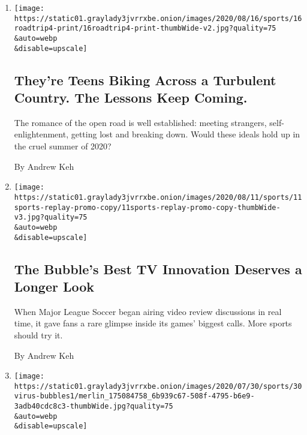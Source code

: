 \begin{enumerate}
\def\labelenumi{\arabic{enumi}.}
\item
  \href{/2020/08/16/sports/cycling/coronavirus-protests-masks-biking.html}{}

  \texttt{[image: https://static01.graylady3jvrrxbe.onion/images/2020/08/16/sports/16roadtrip4-print/16roadtrip4-print-thumbWide-v2.jpg?quality=75\\\&auto=webp\\\&disable=upscale]}

  \hypertarget{theyre-teens-biking-across-a-turbulent-country-the-lessons-keep-coming}{%
  \subsection{They're Teens Biking Across a Turbulent Country. The
  Lessons Keep
  Coming.}\label{theyre-teens-biking-across-a-turbulent-country-the-lessons-keep-coming}}

  The romance of the open road is well established: meeting strangers,
  self-enlightenment, getting lost and breaking down. Would these ideals
  hold up in the cruel summer of 2020?

  By Andrew Keh
\item
  \href{/2020/08/11/sports/soccer/MLS-VAR-portland-orlando.html}{}

  \texttt{[image: https://static01.graylady3jvrrxbe.onion/images/2020/08/11/sports/11sports-replay-promo-copy/11sports-replay-promo-copy-thumbWide-v3.jpg?quality=75\\\&auto=webp\\\&disable=upscale]}

  \hypertarget{the-bubbles-best-tv-innovation-deserves-a-longer-look}{%
  \subsection{The Bubble's Best TV Innovation Deserves a Longer
  Look}\label{the-bubbles-best-tv-innovation-deserves-a-longer-look}}

  When Major League Soccer began airing video review discussions in real
  time, it gave fans a rare glimpse inside its games' biggest calls.
  More sports should try it.

  By Andrew Keh
\item
  \href{/2020/07/30/sports/basketball/sports-bubble-nba-mlb.html}{}

  \texttt{[image: https://static01.graylady3jvrrxbe.onion/images/2020/07/30/sports/30virus-bubbles1/merlin\_175084758\_6b939c67-508f-4795-b6e9-3adb40cdc8c3-thumbWide.jpg?quality=75\\\&auto=webp\\\&disable=upscale]}


\end{enumerate}

